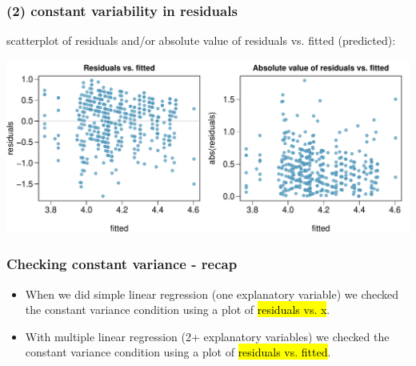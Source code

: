
\begin{frame}
\frametitle{(2) constant variability in residuals}

scatterplot of residuals and/or absolute value of residuals vs. fitted (predicted): \\

\begin{center}
\includegraphics[width=\textwidth]{9-3_model_cond/figures/beauty/homo_res}
\end{center}


\end{frame}


\begin{frame}
\frametitle{Checking constant variance - recap}

\begin{itemize}

\item When we did simple linear regression (one explanatory variable) we checked the constant variance condition using a plot of \hl{residuals vs. x}.

\item With multiple linear regression (2+ explanatory variables) we checked the constant variance condition using a plot of \hl{residuals vs. fitted}. 

\end{itemize}

$\:$ \\



\end{frame}

